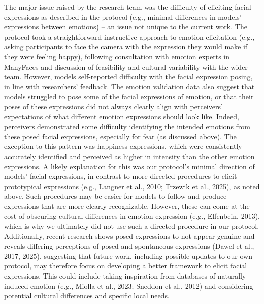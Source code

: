 \documentclass[
  letterpaper,
  DIV=11,
  numbers=noendperiod]{scrartcl}
\begin{document}
The major issue raised by the research team was the difficulty of
eliciting facial expressions as described in the protocol (e.g., minimal
differences in models' expressions between emotions) -- an issue not
unique to the current work. The protocol took a straightforward
instructive approach to emotion elicitation (e.g., asking participants
to face the camera with the expression they would make if they were
feeling happy), following consultation with emotion experts in ManyFaces
and discussion of feasibility and cultural variability with the wider
team. However, models self-reported difficulty with the facial
expression posing, in line with researchers' feedback. The emotion
validation data also suggest that models struggled to pose some of the
facial expressions of emotion, or that their poses of these expressions
did not always clearly align with perceivers' expectations of what
different emotion expressions should look like. Indeed, perceivers
demonstrated some difficulty identifying the intended emotions from
these posed facial expressions, especially for fear (as discussed
above). The exception to this pattern was happiness expressions, which
were consistently accurately identified and perceived as higher in
intensity than the other emotion expressions. A likely explanation for
this was our protocol's minimal direction of models' facial expressions,
in contrast to more directed procedures to elicit prototypical
expressions (e.g., Langner et al., 2010; Trzewik et al., 2025), as noted
above. Such procedures may be easier for models to follow and produce
expressions that are more clearly recognizable. However, these can come
at the cost of obscuring cultural differences in emotion expression
(e.g., Elfenbein, 2013), which is why we ultimately did not use such a
directed procedure in our protocol. Additionally, recent research shows
posed expressions to not appear genuine and reveals differing
perceptions of posed and spontaneous expressions (Dawel et al., 2017,
2025), suggesting that future work, including possible updates to our
own protocol, may therefore focus on developing a better framework to
elicit facial expressions. This could include taking inspiration from
databases of naturally-induced emotion (e.g., Miolla et al., 2023;
Sneddon et al., 2012) and considering potential cultural differences and
specific local needs.
\end{document}

